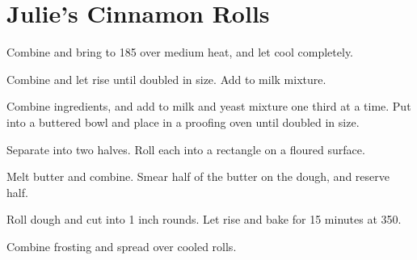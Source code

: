 \section{Julie's Cinnamon Rolls}
\begin{recipe}



Combine and bring to 185\degree{} over medium heat, 
and let cool completely. 


Combine and let rise until doubled in size. Add to 
milk mixture. 


Combine ingredients, and add to milk and yeast mixture
one third at a time. Put into a buttered bowl and place
in a proofing oven until doubled in size. 

Separate into two halves. Roll each into a rectangle on 
a floured surface. 


Melt butter and combine. Smear half of the butter on
the dough, and reserve half. 

Roll dough and cut into 1 inch rounds. Let
rise and bake for 15 minutes at 350\degree{}.


Combine frosting and spread over cooled rolls. 

\end{recipe}
